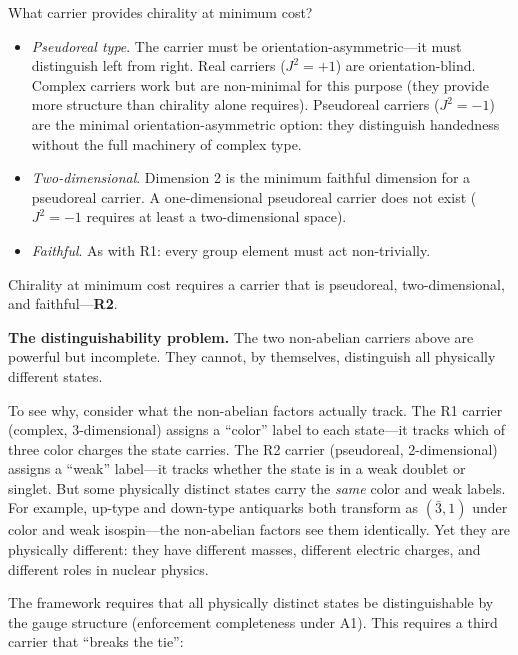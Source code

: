 \documentclass[11pt]{article}
\newenvironment{varlist}{\begin{itemize}[nosep,leftmargin=2em]}{\end{itemize}}
\begin{document}
What carrier provides chirality at minimum cost?

\begin{varlist}
\item \textit{Pseudoreal type}.  The carrier must be orientation-asymmetric---it must distinguish left from right.  Real carriers ($J^2 = +1$) are orientation-blind.  Complex carriers work but are non-minimal for this purpose (they provide more structure than chirality alone requires).  Pseudoreal carriers ($J^2 = -1$) are the minimal orientation-asymmetric option: they distinguish handedness without the full machinery of complex type.
\item \textit{Two-dimensional}.  Dimension 2 is the minimum faithful dimension for a pseudoreal carrier.  A one-dimensional pseudoreal carrier does not exist ($J^2 = -1$ requires at least a two-dimensional space).
\item \textit{Faithful}.  As with R1: every group element must act non-trivially.
\end{varlist}

\noindent Chirality at minimum cost requires a carrier that is pseudoreal, two-dimensional, and faithful---\textbf{R2}.

\medskip
\textbf{The distinguishability problem.}  The two non-abelian carriers above are powerful but incomplete.  They cannot, by themselves, distinguish all physically different states.

To see why, consider what the non-abelian factors actually track.  The R1 carrier (complex, 3-dimensional) assigns a ``color'' label to each state---it tracks which of three color charges the state carries.  The R2 carrier (pseudoreal, 2-dimensional) assigns a ``weak'' label---it tracks whether the state is in a weak doublet or singlet.  But some physically distinct states carry the \emph{same} color and weak labels.  For example, up-type and down-type antiquarks both transform as $(\bar{3}, 1)$ under color and weak isospin---the non-abelian factors see them identically.  Yet they are physically different: they have different masses, different electric charges, and different roles in nuclear physics.

The framework requires that all physically distinct states be distinguishable by the gauge structure (enforcement completeness under A1).  This requires a third carrier that ``breaks the tie'':
\end{document}
